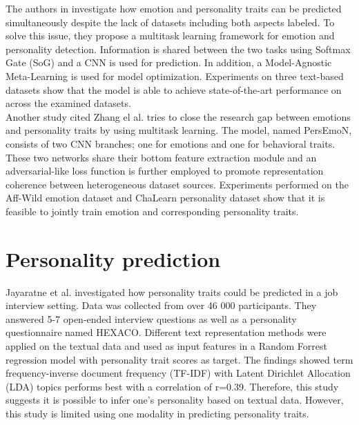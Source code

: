 The authors in \cite{personality-emotion1-LI2022340} investigate how emotion and personality traits can be predicted simultaneously despite the lack of datasets including both aspects labeled. To solve this issue, they propose a multitask learning framework for emotion and personality detection. Information is shared between the two tasks using Softmax Gate (SoG) and a CNN is used for prediction. In addition, a Model-Agnostic Meta-Learning is used for model optimization. Experiments on three text-based datasets show that the model is able to achieve state-of-the-art performance on across the examined datasets. \\

Another study cited Zhang el al. \cite{personality-emotion2-8897617} tries to close the research gap between emotions and personality traits by using multitask learning. The model, named PersEmoN, consists of two CNN branches; one for emotions and one for behavioral traits. These two networks share their bottom feature extraction module and an adversarial-like loss function is further employed to promote representation coherence between heterogeneous dataset sources. Experiments performed on the Aff-Wild emotion dataset and ChaLearn personality dataset show that it is feasible to jointly train emotion and corresponding personality traits. 

\section{Personality prediction}
Jayaratne et al. \cite{personality-prediction-questions-9121971} investigated how personality traits could be predicted in a job interview setting. Data was collected from over 46 000 participants. They answered 5-7 open-ended interview questions as well as a personality questionnaire named HEXACO. Different text representation methods were applied on the textual data and used as input features in a Random Forrest regression model with personality trait scores as target. The findings showed term frequency-inverse document frequency (TF-IDF) with Latent Dirichlet Allocation (LDA) topics performs best with a correlation of r=0.39. Therefore, this study suggests it is possible to infer one's personality based on textual data. However, this study is limited using one modality in predicting personality traits.  \\ 

